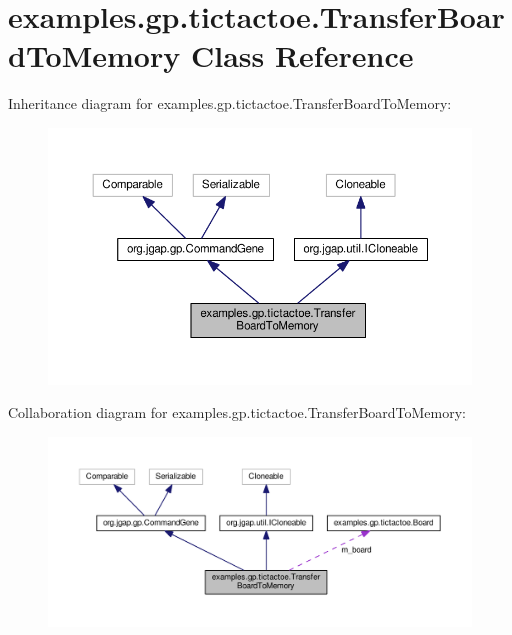 \hypertarget{classexamples_1_1gp_1_1tictactoe_1_1_transfer_board_to_memory}{\section{examples.\-gp.\-tictactoe.\-Transfer\-Board\-To\-Memory Class Reference}
\label{classexamples_1_1gp_1_1tictactoe_1_1_transfer_board_to_memory}
}


Inheritance diagram for examples.\-gp.\-tictactoe.\-Transfer\-Board\-To\-Memory\-:
\nopagebreak
\begin{figure}[H]
\begin{center}
\leavevmode
\includegraphics[width=350pt]{classexamples_1_1gp_1_1tictactoe_1_1_transfer_board_to_memory__inherit__graph}
\end{center}
\end{figure}


Collaboration diagram for examples.\-gp.\-tictactoe.\-Transfer\-Board\-To\-Memory\-:
\nopagebreak
\begin{figure}[H]
\begin{center}
\leavevmode
\includegraphics[width=350pt]{classexamples_1_1gp_1_1tictactoe_1_1_transfer_board_to_memory__coll__graph}
\end{center}
\end{figure}
